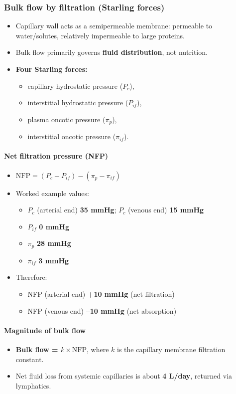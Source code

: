 \documentclass[11pt,a4paper]{article}
\begin{document}
\subsubsection{Bulk flow by filtration (Starling forces)}
\begin{itemize}
\item Capillary wall acts as a semipermeable membrane: permeable to water/solutes, relatively impermeable to large proteins.
\item Bulk flow primarily governs \textbf{fluid distribution}, not nutrition.
\item \textbf{Four Starling forces:}
  \begin{itemize}
  \item capillary hydrostatic pressure (\textbf{$P_c$}),
  \item interstitial hydrostatic pressure (\textbf{$P_{if}$}),
  \item plasma oncotic pressure (\textbf{$\pi_p$}),
  \item interstitial oncotic pressure (\textbf{$\pi_{if}$}).
  \end{itemize}
\end{itemize}

\paragraph{Net filtration pressure (NFP)}
\begin{itemize}
\item \textbf{$\mathrm{NFP} = (P_c - P_{if}) - (\pi_p - \pi_{if})$}
\item Worked example values:
  \begin{itemize}
  \item $P_c$ (arterial end) \textbf{35 mmHg}; $P_c$ (venous end) \textbf{15 mmHg}
  \item $P_{if}$ \textbf{0 mmHg}
  \item $\pi_p$ \textbf{28 mmHg}
  \item $\pi_{if}$ \textbf{3 mmHg}
  \end{itemize}
\item Therefore:
  \begin{itemize}
  \item NFP (arterial end) \textbf{+10 mmHg} (net filtration)
  \item NFP (venous end) \textbf{--10 mmHg} (net absorption)
  \end{itemize}
\end{itemize}

\paragraph{Magnitude of bulk flow}
\begin{itemize}
\item \textbf{Bulk flow = $k \times \mathrm{NFP}$}, where \textbf{$k$} is the capillary membrane filtration constant.
\item Net fluid loss from systemic capillaries is about \textbf{4 L/day}, returned via lymphatics.
\end{itemize}
\end{document}
